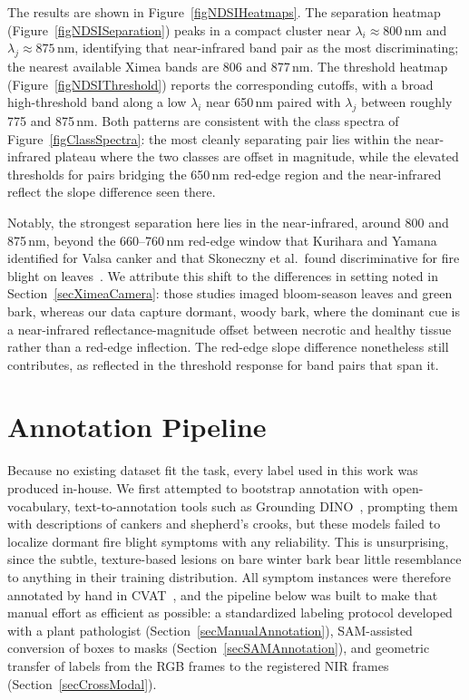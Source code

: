 The results are shown in Figure~\ref{figNDSIHeatmaps}.
The separation heatmap (Figure~\ref{figNDSISeparation}) peaks in a
compact cluster near $\lambda_i \approx 800$\,nm and
$\lambda_j \approx 875$\,nm, identifying that near-infrared band
pair as the most discriminating; the nearest available Ximea bands
are 806 and 877\,nm.
The threshold heatmap (Figure~\ref{figNDSIThreshold}) reports the
corresponding cutoffs, with a broad high-threshold band along a low
$\lambda_i$ near 650\,nm paired with $\lambda_j$ between roughly 775
and 875\,nm.
Both patterns are consistent with the class spectra of
Figure~\ref{figClassSpectra}: the most cleanly separating pair lies
within the near-infrared plateau where the two classes are offset in
magnitude, while the elevated thresholds for pairs bridging the
650\,nm red-edge region and the near-infrared reflect the slope
difference seen there.

Notably, the strongest separation here lies in the near-infrared,
around 800 and 875\,nm, beyond the 660--760\,nm red-edge window that
Kurihara and Yamana identified for Valsa canker and that Skoneczny
et al.\ found discriminative for fire blight on
leaves~\cite{Skoneczny2020DetectionFireBlightAppleHyperspectralLeaf,
Kurihara2022DetectionValsaCankerHyperspectralCanker}.
We attribute this shift to the differences in setting noted in
Section~\ref{secXimeaCamera}: those studies imaged bloom-season
leaves and green bark, whereas our data capture dormant, woody bark,
where the dominant cue is a near-infrared reflectance-magnitude
offset between necrotic and healthy tissue rather than a red-edge
inflection.
The red-edge slope difference nonetheless still contributes, as
reflected in the threshold response for band pairs that span it.
\fi

\section{Annotation Pipeline} \label{secAnnotation}

Because no existing dataset fit the task, every label used in this
work was produced in-house.
We first attempted to bootstrap annotation with open-vocabulary,
text-to-annotation tools such as Grounding
DINO~\cite{liu2023groundingdino}, prompting them with descriptions of
cankers and shepherd's crooks, but these models failed to localize
dormant fire blight symptoms with any reliability. This is unsurprising,
since the subtle, texture-based lesions on bare winter bark bear little
resemblance to anything in their training distribution.
All symptom instances were therefore annotated by hand in
CVAT~\cite{cvat}, and the pipeline below was built to make that
manual effort as efficient as possible: a standardized labeling
protocol developed with a plant pathologist
(Section~\ref{secManualAnnotation}), SAM-assisted conversion of
boxes to masks (Section~\ref{secSAMAnnotation}), and geometric
transfer of labels from the RGB frames to the registered NIR frames
(Section~\ref{secCrossModal}).

